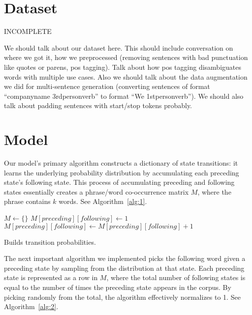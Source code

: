 \documentclass[11pt]{article}
\begin{document}
\section{Dataset}

INCOMPLETE

We should talk about our dataset here. This should include conversation on where we got it, how we preprocessed (removing sentences with bad punctuation like quotes or parens, pos tagging). Talk about how pos tagging disambiguates words with multiple use cases. Also we should talk about the data augmentation we did for multi-sentence generation (converting sentences of format ``companyname 3rdpersonverb'' to format ``We 1stpersonverb''). We should also talk about padding sentences with start/stop tokens probably.

\section{Model}

Our model's primary algorithm constructs a dictionary of state transitions: it  learns the underlying probability distribution by accumulating each preceding state's following state. This process of accumulating preceding and following states essentially creates a phrase/word co-occurrence matrix \(M\), where the phrase contains \(k\) words. See Algorithm~\ref{alg:1}.

\begin{algorithm}
  \begin{algorithmic}
          {$M \gets \{\}$}
        \EndIf
          {$M[preceding][following] \gets 1$}
        \Else
          {$ M[preceding][following] \gets M[preceding][following]+1$}
        \EndIf
      \EndFor
    \EndFor
    \EndProcedure{}
  \end{algorithmic}
  \caption{Builds transition probabilities.}
  \label{alg:1}
\end{algorithm}

The next important algorithm we implemented picks the following word given a preceding state by sampling from the distribution at that state. Each preceding state is represented as a row in \(M\), where the total number of following states is equal to the number of times the preceding state appears in the corpus. By picking randomly from the total, the algorithm effectively normalizes to 1. See Algorithm~\ref{alg:2}.
\end{document}
